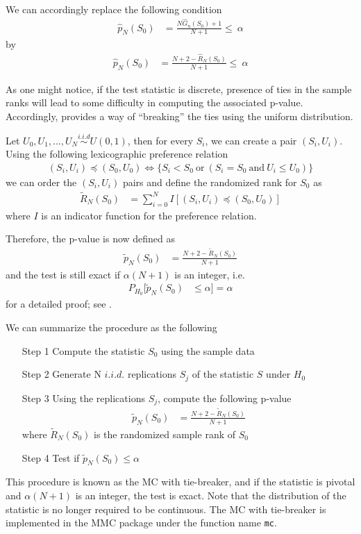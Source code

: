 \documentclass[11pt]{article}\usepackage[]{graphicx}\usepackage[]{color}
\newcommand{\pkg}[1]{{\normalfont\fontseries{b}\selectfont #1}}
\let\code=\texttt
\begin{document}
We can accordingly replace the following condition
\begin{align}
\hat{p}_{N}(S_{0}) & = \frac{N\hat{G}_{n}(S_{0})+1}{N+1} \leq\ \alpha
\end{align}
by
\begin{align}
\hat{p}_{N}(S_{0}) & = \frac{N + 2 -\hat{R}_N(S_0)}{N+1} \leq\ \alpha
\end{align}

As one might notice, if the test statistic is discrete, presence of ties in the sample ranks will lead to some difficulty in computing the associated p-value. Accordingly, \cite{dufour_monte_2006} provides a way of ``breaking'' the ties using the uniform distribution.

Let $U_0, U_1,...,U_N \overset{i.i.d}{\sim} U(0,1)$, then for every $S_i$, we can create a pair $(S_i,U_i)$. Using the following lexicographic preference relation
\begin{align}
(S_i,U_i) \preccurlyeq (S_0,U_0) \Longleftrightarrow \{ S_i<S_0 \ \mathrm{or} \ ( S_i = S_0 \ \mathrm{and} \ U_i \leq U_0 ) \}
\end{align}
we can order the $(S_i,U_i)$ pairs and define the randomized rank for $S_0$ as
\begin{align}
\tilde{R}_{N}(S_0) & = \sum_{i=0}^{N}I[(S_i,U_i) \preccurlyeq (S_0,U_0)]
\end{align}
where $I$ is an indicator function for the preference relation.

Therefore, the p-value is now defined as
\begin{align}
\tilde{p}_{N}(S_{0}) & = \frac{N + 2 -\tilde{R}_N(S_0)}{N+1}
\end{align}
and the test is still exact if $\alpha(N+1)$ is an integer, i.e.
\begin{align}
P_{H_{0}}[\tilde{p}_{N}(S_{0}) & \leq\alpha]=\alpha
\end{align}
for a detailed proof; see \citet{dufour_monte_2006}.

We can summarize the procedure as the following
\begin{itemize}
\item[Step 1] Compute the statistic $S_0$ using the sample data
\item[Step 2] Generate N $i.i.d.$ replications $S_{j}$ of the statistic $S$ under $H_0$
\item[Step 3] Using the replications $S_{j}$, compute the following p-value
\begin{align}
\tilde{p}_{N}(S_{0}) & = \frac{N + 2 -\tilde{R}_N(S_0)}{N+1}
\end{align}
where $\tilde{R}_N(S_0)$ is the randomized sample rank of $S_0$
\item[Step 4]  Test if $\tilde{p}_{N}(S_{0})\leq \alpha$
\end{itemize}
This procedure is known as the MC with tie-breaker, and if the statistic is pivotal and $\alpha(N+1)$ is an integer, the test is exact. Note that the distribution of the statistic is no longer required to be continuous. The MC with tie-breaker is implemented in the \pkg{MMC} package under the function name \code{mc}.
\end{document}
